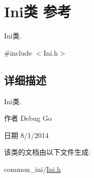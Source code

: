 \hypertarget{class_ini}{\section{Ini类 参考}
\label{class_ini}
}


Ini类.  




{\ttfamily \#include $<$Ini.\+h$>$}



\subsection{详细描述}
Ini类. 

\begin{DoxyAuthor}{作者}
Debug Go 
\end{DoxyAuthor}
\begin{DoxyDate}{日期}
8/1/2014 
\end{DoxyDate}


该类的文档由以下文件生成\+:\begin{DoxyCompactItemize}
\item 
common\+\_\+ini/\hyperlink{_ini_8h}{Ini.\+h}\end{DoxyCompactItemize}
